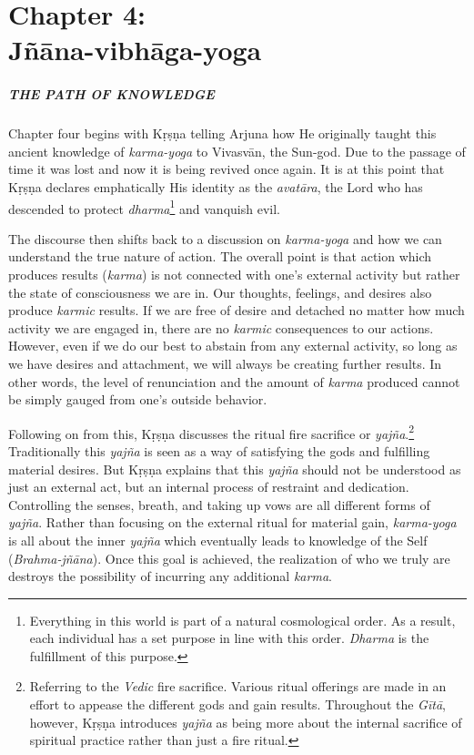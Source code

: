 \chapter{Chapter 4: \\Jñāna-vibhāga-yoga}\label{chap-jnana-vibhaga-yoga}

\paragraph*{\MakeUppercase{The Path of Knowledge}}

\noindent Chapter four begins with Kṛṣṇa telling Arjuna how He originally taught this ancient knowledge of \textit{karma-yoga} to Vivasvān, the Sun-god. Due to the passage of time it was lost and now it is being revived once again. It is at this point that Kṛṣṇa declares emphatically His identity as the \textit{avatāra}, the Lord who has descended to protect \textit{dharma}\footnote{Everything in this world is part of a natural cosmological order. As a result, each individual has a set purpose in line with this order. \textit{Dharma} is the fulfillment of this purpose.} and vanquish evil.

The discourse then shifts back to a discussion on \textit{karma-yoga} and how we can understand the true nature of action. The overall point is that action which produces results (\textit{karma}) is not connected with one’s external activity but rather the state of consciousness we are in. Our thoughts, feelings, and desires also produce \textit{karmic} results. If we are free of desire and detached no matter how much activity we are engaged in, there are no \textit{karmic} consequences to our actions. However, even if we do our best to abstain from any external activity, so long as we have desires and attachment, we will always be creating further results. In other words, the level of renunciation and the amount of \textit{karma} produced cannot be simply gauged from one’s outside behavior.

Following on from this, Kṛṣṇa discusses the ritual fire sacrifice or \textit{yajña}.\footnote{Referring to the \textit{Vedic} fire sacrifice. Various ritual offerings are made in an effort to appease the different gods and gain results. Throughout the \textit{Gītā}, however, Kṛṣṇa introduces \textit{yajña} as being more about the internal sacrifice of spiritual practice rather than just a fire ritual.} Traditionally this \textit{yajña} is seen as a way of satisfying the gods and fulfilling material desires. But Kṛṣṇa explains that this \textit{yajña} should not be understood as just an external act, but an internal process of restraint and dedication. Controlling the senses, breath, and taking up vows are all different forms of \textit{yajña}. Rather than focusing on the external ritual for material gain, \textit{karma-yoga} is all about the inner \textit{yajña} which eventually leads to knowledge of the Self (\textit{Brahma-jñāna}). Once this goal is achieved, the realization of who we truly are destroys the possibility of incurring any additional \textit{karma}.

